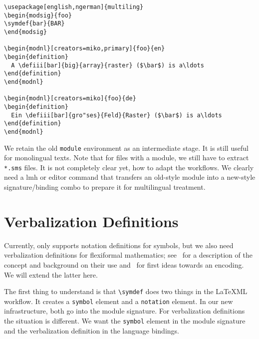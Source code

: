 \documentclass{bluenote}
\def\latexml{{\LaTeX}ML\xspace}
\def\lmh{\textsf{lmh}\xspace}
\def\lstomdoc{\lstinline[language={[1.3]OMDoc}]}
\begin{document}
\begin{lstlisting}[caption=New-Style \protect\sTeX,label=lst:newmods]
\usepackage[english,ngerman]{multiling}
\begin{modsig}{foo}
\symdef{bar}{BAR}
\end{modsig}

\begin{modnl}[creators=miko,primary]{foo}{en}
\begin{definition}
  A \defiii[bar]{big}{array}{raster} ($\bar$) is a\ldots
\end{definition}
\end{modnl}

\begin{modnl}[creators=miko]{foo}{de}
\begin{definition}
  Ein \defiii[bar]{gro"ses}{Feld}{Raster} ($\bar$) is a\ldots
\end{definition}
\end{modnl}
\end{lstlisting}
We retain the old \lstinline|module| environment as an intermediate stage. It is still
useful for monolingual texts. Note that for files with a module, we still have to extract
\lstinline|*.sms| files. It is not completely clear yet, how to adapt the workflows. We
clearly need a \lmh or editor command that transfers an old-style module into a new-style
signature/binding combo to prepare it for multilingual treatment.

\section{Verbalization Definitions}

Currently, \sTeX only supports notation definitions for symbols, but we also need
verbalization definitions for flexiformal mathematics; see~\cite{Kohlhase:dmesmgm14} for a
description of the concept and background on their use and~\cite[section
5]{Kohlhase:dmsmglom14} for first ideas towards an \sTeX encoding. We will extend the
latter here.

The first thing to understand is that \lstinline|\symdef| does two things in the \latexml
workflow. It creates a \lstomdoc|symbol| element and a
\lstomdoc|notation| element. In our new infrastructure, both go into the module
signature. For verbalization definitions the situation is different. We want the
\lstomdoc|symbol| element in the module signature and the verbalization definition in the
language bindings.
\end{document}
